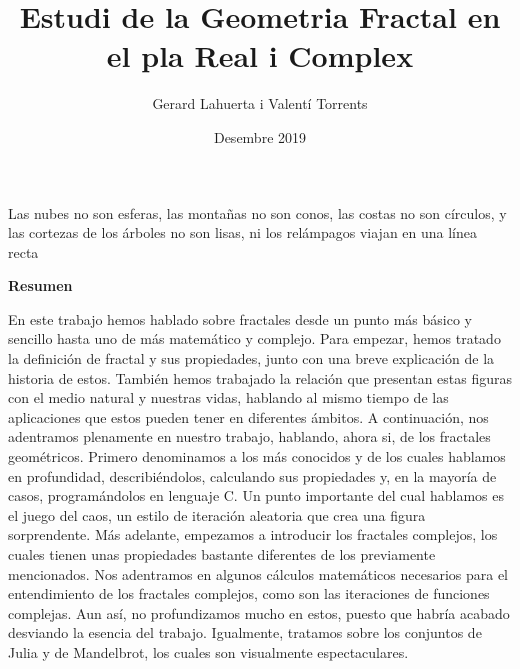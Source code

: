 \documentclass[12pt]{report}
\title{Estudi de la Geometria Fractal en el pla Real i Complex}
\author{Gerard Lahuerta  i Valentí Torrents}
\date{Desembre 2019}
\begin{document}
\justifying
\maketitle


\newpage
\thispagestyle{empty}
\hspace{6cm}
    \begin{minipage}{0.5\linewidth}
        \vspace{10cm}%
        {\small
           Las nubes no son esferas, las montañas no son conos, las costas no son círculos, y las cortezas de los árboles no son lisas, ni los relámpagos viajan en una línea recta
        }
        \vspace{5pt}%
    \end{minipage}
 


\newpage
\setcounter{page}{3}
\pagestyle{plain}
\tableofcontents

\cleardoublepage
{}
\newpage

\centerline{\textbf{Resumen}}
 En este trabajo hemos hablado sobre fractales desde un punto más básico y sencillo hasta uno de más matemático y complejo. Para empezar, hemos tratado la definición de fractal y sus propiedades, junto con una breve explicación de la historia de estos. También hemos trabajado la relación que presentan estas figuras con el medio natural y nuestras vidas, hablando al mismo tiempo de las aplicaciones que estos pueden tener en diferentes ámbitos. A continuación, nos adentramos plenamente en nuestro trabajo, hablando, ahora si, de los fractales geométricos. Primero denominamos a los más conocidos y de los cuales hablamos en profundidad, describiéndolos, calculando sus propiedades y, en la mayoría de casos, programándolos en lenguaje C. Un punto importante del cual hablamos es el juego del caos, un estilo de iteración aleatoria que crea una figura sorprendente. Más adelante, empezamos a introducir los fractales complejos, los cuales tienen unas propiedades bastante diferentes de los previamente mencionados. Nos adentramos en algunos cálculos matemáticos necesarios para el entendimiento de los fractales complejos, como son las iteraciones de funciones complejas. Aun así, no profundizamos mucho en estos, puesto que habría acabado desviando la esencia del trabajo. Igualmente, tratamos sobre los conjuntos de Julia y de Mandelbrot, los cuales son visualmente espectaculares.
\end{document}
